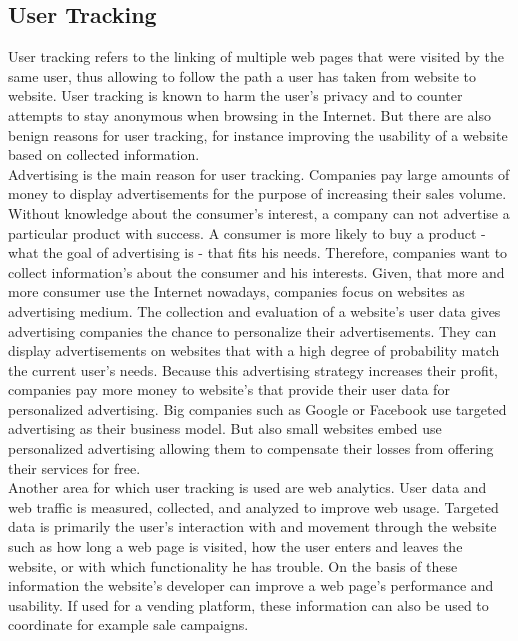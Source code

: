 \documentclass[article,colorback,accentcolor=tud9c,type=bsc]{tudthesis}
\let\stdsubsection\subsection
\renewcommand\subsection{\newpage\stdsubsection}
\begin{document}
\subsection{User Tracking}

	User tracking refers to the linking of multiple web pages that were visited by the same user, thus allowing to follow the path a user has taken from website to website. User tracking is known to harm the user's privacy and to counter attempts to stay anonymous when browsing in the Internet. But there are also benign reasons for user tracking, for instance improving the usability of a website based on collected information. \\ 
	
	Advertising is the main reason for user tracking. Companies pay large amounts of money to display advertisements for the purpose of increasing their sales volume. Without knowledge about the consumer's interest, a company can not advertise a particular product with success. A consumer is more likely to buy a product - what the goal of advertising is - that fits his needs. Therefore, companies want to collect information's about the consumer and his interests. Given, that more and more consumer use the Internet nowadays, companies focus on websites as advertising medium. The collection and evaluation of a website's user data gives advertising companies the chance to personalize their advertisements. They can display advertisements on websites that 	with a high degree of probability match the current user's needs. Because this advertising strategy increases their profit, companies pay more money to website's that provide their user data for personalized advertising. Big companies such as Google or Facebook use targeted advertising as their business model. But also small websites embed use personalized advertising allowing them to compensate their losses from offering their services for free. \\
	
	Another area for which user tracking is used are web analytics. User data and web traffic is measured, collected, and analyzed to improve web usage. Targeted data is primarily the user's interaction with and movement through the website such as how long a web page is visited, how the user enters and leaves the website, or with which functionality he has trouble. On the basis of these information the website's developer can improve a web page's performance and usability. If used for a vending platform, these information can also be used to coordinate for example sale campaigns. \\
	
\end{document}
